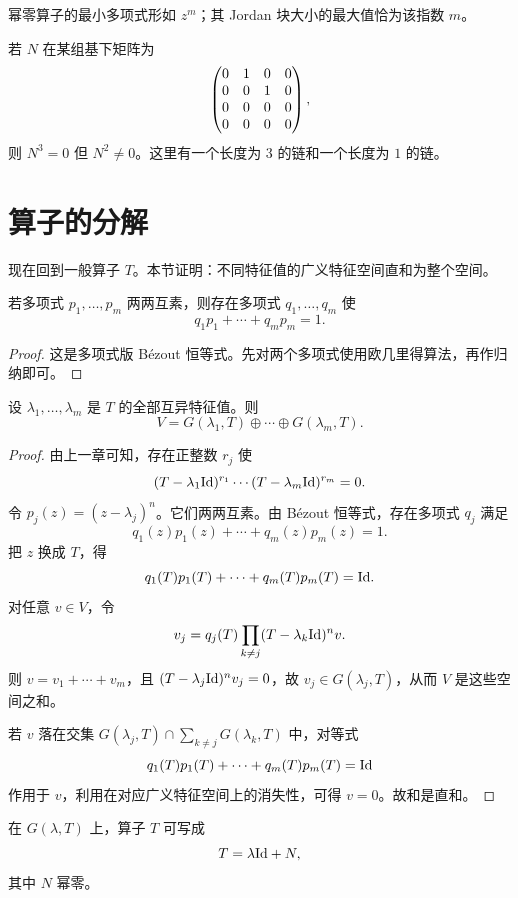 \begin{corollary}
幂零算子的最小多项式形如 $z^m$；其 Jordan 块大小的最大值恰为该指数 $m$。
\end{corollary}

\begin{example}
若 $N$ 在某组基下矩阵为
\[
\begin{pmatrix} 0&1&0&0\\0&0&1&0\\0&0&0&0\\0&0&0&0 \end{pmatrix},
\]
则 $N^3=0$ 但 $N^2\neq0$。这里有一个长度为 $3$ 的链和一个长度为 $1$ 的链。
\end{example}

\section{算子的分解}

现在回到一般算子 $T$。本节证明：不同特征值的广义特征空间直和为整个空间。

\begin{lemma}
若多项式 $p_1,\dots,p_m$ 两两互素，则存在多项式 $q_1,\dots,q_m$ 使
\[
q_1p_1+\cdots+q_mp_m=1.
\]
\end{lemma}

\begin{proof}
这是多项式版 Bézout 恒等式。先对两个多项式使用欧几里得算法，再作归纳即可。
\end{proof}

\begin{theorem}[广义特征空间分解]
设 $\lambda_1,\dots,\lambda_m$ 是 $T$ 的全部互异特征值。则
\[
V=G(\lambda_1,T)\oplus\cdots\oplus G(\lambda_m,T).
\]
\end{theorem}

\begin{proof}
由上一章可知，存在正整数 $r_j$ 使
\[
(T-\lambda_1\mathrm{Id})^{r_1}\cdots(T-\lambda_m\mathrm{Id})^{r_m}=0.
\]
令 $p_j(z)=(z-\lambda_j)^n$。它们两两互素。由 Bézout 恒等式，存在多项式 $q_j$ 满足
\[
q_1(z)p_1(z)+\cdots+q_m(z)p_m(z)=1.
\]
把 $z$ 换成 $T$，得
\[
q_1(T)p_1(T)+\cdots+q_m(T)p_m(T)=\mathrm{Id}.
\]
对任意 $v\in V$，令
\[
v_j=q_j(T)\prod_{k\neq j}(T-\lambda_k\mathrm{Id})^n v.
\]
则 $v=v_1+\cdots+v_m$，且 $(T-\lambda_j\mathrm{Id})^n v_j=0$，故 $v_j\in G(\lambda_j,T)$，从而 $V$ 是这些空间之和。

若 $v$ 落在交集 $G(\lambda_j,T)\cap\sum_{k\neq j}G(\lambda_k,T)$ 中，对等式
\[
q_1(T)p_1(T)+\cdots+q_m(T)p_m(T)=\mathrm{Id}
\]
作用于 $v$，利用在对应广义特征空间上的消失性，可得 $v=0$。故和是直和。
\end{proof}

\begin{corollary}
在 $G(\lambda,T)$ 上，算子 $T$ 可写成
\[
T=\lambda\mathrm{Id}+N,
\]
其中 $N$ 幂零。
\end{corollary}

